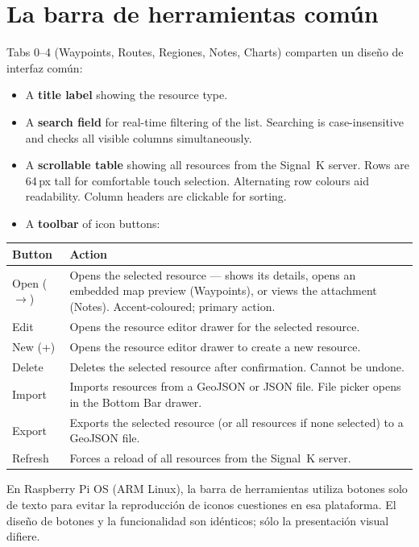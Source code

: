 \section{La barra de herramientas común}

Tabs 0--4 (Waypoints, Routes, Regiones, Notes, Charts) comparten un diseño de interfaz común:

\begin{itemize}
  \item A \textbf{title label} showing the resource type.
  \item A \textbf{search field} for real-time filtering of the list. Searching is case-insensitive and checks all visible columns simultaneously.
  \item A \textbf{scrollable table} showing all resources from the Signal~K server. Rows are 64\,px tall for comfortable touch selection. Alternating row colours aid readability. Column headers are clickable for sorting.
  \item A \textbf{toolbar} of icon buttons:
\end{itemize}

\begin{longtable}{L{3cm} L{10.7cm}}
\toprule
{}
{\sffamily\bfseries\color{white} Button} &
{\sffamily\bfseries\color{white} Action} \\
\midrule
Open ($\rightarrow$) & Opens the selected resource --- shows its details, opens an embedded map preview (Waypoints), or views the attachment (Notes). Accent-coloured; primary action. \\
Edit & Opens the resource editor drawer for the selected resource. \\
New (+) & Opens the resource editor drawer to create a new resource. \\
Delete & Deletes the selected resource after confirmation. Cannot be undone. \\
Import & Imports resources from a GeoJSON or JSON file. File picker opens in the Bottom Bar drawer. \\
Export & Exports the selected resource (or all resources if none selected) to a GeoJSON file. \\
Refresh & Forces a reload of all resources from the Signal~K server. \\
\bottomrule
\end{longtable}

\begin{notebox}
En Raspberry Pi OS (ARM Linux), la barra de herramientas utiliza botones solo de texto para evitar la reproducción de iconos
cuestiones en esa plataforma.
El diseño de botones y la funcionalidad son idénticos; sólo la presentación visual difiere.
\end{notebox}

